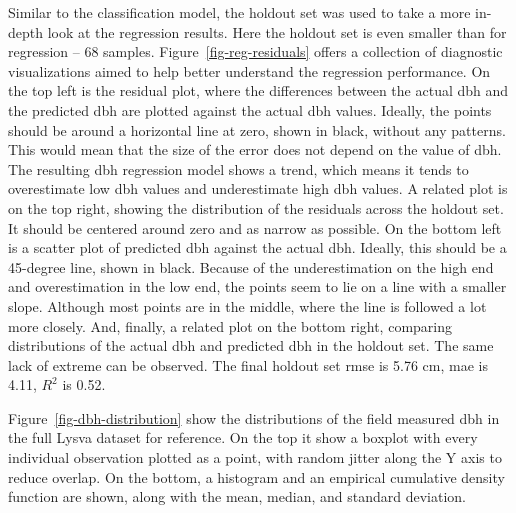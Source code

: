 Similar to the classification model, the holdout set was used to take a more in-depth look at the regression results.
Here the holdout set is even smaller than for regression – 68 samples.
Figure~\ref{fig-reg-residuals} offers a collection of diagnostic visualizations aimed to help better understand the regression performance.
On the top left is the residual plot, where the differences between the actual \gls{dbh} and the predicted \gls{dbh} are plotted against the actual \gls{dbh} values.
Ideally, the points should be around a horizontal line at zero, shown in black, without any patterns.
This would mean that the size of the error does not depend on the value of \gls{dbh}.
The resulting \gls{dbh} regression model shows a trend, which means it tends to overestimate low \gls{dbh} values and underestimate high \gls{dbh} values.
A related plot is on the top right, showing the distribution of the residuals across the holdout set.
It should be centered around zero and as narrow as possible.
On the bottom left is a scatter plot of predicted \gls{dbh} against the actual \gls{dbh}.
Ideally, this should be a 45-degree line, shown in black.
Because of the underestimation on the high end and overestimation in the low end, the points seem to lie on a line with a smaller slope.
Although most points are in the middle, where the line is followed a lot more closely.
And, finally, a related plot on the bottom right, comparing distributions of the actual \gls{dbh} and predicted \gls{dbh} in the holdout set.
The same lack of extreme can be observed.
The final holdout set \gls{rmse} is 5.76 cm, \gls{mae} is 4.11, $R^2$ is 0.52.

Figure~\ref{fig-dbh-distribution} show the distributions of the field measured \gls{dbh} in the full Lysva dataset for reference.
On the top it show a boxplot with every individual observation plotted as a point, with random jitter along the Y axis to reduce overlap.
On the bottom, a histogram and an empirical cumulative density function are shown, along with the mean, median, and standard deviation.

